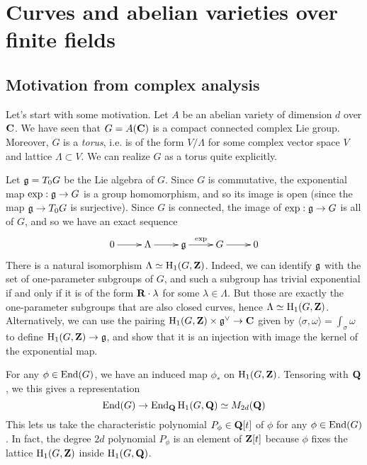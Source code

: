 




\section{Curves and abelian varieties over finite fields}


\subsection{Motivation from complex analysis}

Let's start with some motivation. Let $A$ be an abelian variety of dimension 
$d$ over $\mathbf{C}$. We have seen that $G=A(\mathbf{C})$ is a compact connected complex Lie 
group. Moreover, $G$ is a \emph{torus}, i.e. is of the form $V/\Lambda$ for 
some complex vector space $V$ and lattice $\Lambda\subset V$. We can realize 
$G$ as a torus quite explicitly. 

Let $\mathfrak{g}=T_0 G$ be the Lie algebra of $G$. Since $G$ is commutative, the 
exponential map $\exp:\mathfrak{g}\to G$ is a group homomorphism, and so its image is 
open (since the map $\mathfrak{g}\to T_0 G$ is surjective). Since $G$ is connected, 
the image of $\exp:\mathfrak{g}\to G$ is all of $G$, and so we have an exact sequence 
\[\xymatrix{
  0 \ar[r] 
    & \Lambda \ar[r] 
    & \fg \ar[r]^-{\exp} 
    & G \ar[r] 
    & 0
}\]
There is a natural isomorphism $\Lambda\simeq \operatorname{H}_1(G,\mathbf{Z})$. Indeed, we can 
identify $\mathfrak{g}$ with the set of one-parameter subgroups of $G$, and such a 
subgroup has trivial exponential if and only if it is of the form 
$\mathbf{R}\cdot \lambda$ for some $\lambda\in\Lambda$. But those are exactly the 
one-parameter subgroups that are also closed curves, hence 
$\Lambda\simeq \operatorname{H}_1(G,\mathbf{Z})$. Alternatively, we can use the pairing 
$\operatorname{H}_1(G,\mathbf{Z})\times \mathfrak{g}^\vee\to \mathbf{C}$ given by 
$\langle \sigma,\omega\rangle=\int_\sigma\omega$ to define 
$\operatorname{H}_1(G,\mathbf{Z})\to \mathfrak{g}$, and show that it is an injection with image the kernel 
of the exponential map. 

For any $\phi\in \operatorname{End}(G)$, we have an induced map $\phi_\ast$ on 
$\operatorname{H}_1(G,\mathbf{Z})$. Tensoring with $\mathbf{Q}$, we this gives a representation 
\[
  \operatorname{End}(G) \to \operatorname{End}_{\mathbf{Q}}{\operatorname{H}_1(G,\mathbf{Q})} \simeq M_{2 d}(\mathbf{Q})
\]
This lets us take the characteristic polynomial $P_\phi\in \mathbf{Q}[t]$ of $\phi$ 
for any $\phi\in \operatorname{End}(G)$. In fact, the degree $2 d$ polynomial 
$P_\phi$ is an element of $\mathbf{Z}[t]$ because $\phi$ fixes the lattice 
$\operatorname{H}_1(G,\mathbf{Z})$ inside $\operatorname{H}_1(G,\mathbf{Q})$. 

